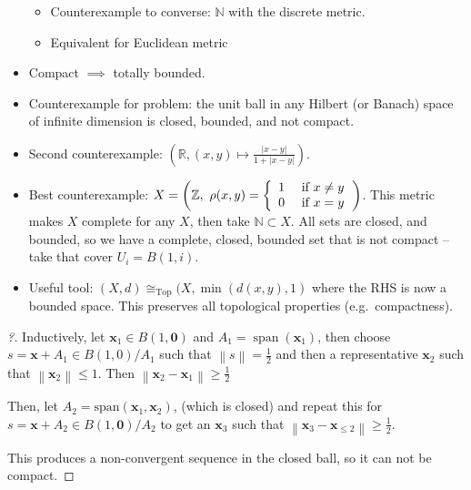 \begin{solution}
\begin{concept}
\begin{itemize}
  \begin{itemize}
  \tightlist
  \item
    Counterexample to converse: \({\mathbb{N}}\) with the discrete
    metric.
  \item
    Equivalent for Euclidean metric
  \end{itemize}
\item
  Compact \(\implies\) totally bounded.
\item
  Counterexample for problem: the unit ball in any Hilbert (or Banach)
  space of infinite dimension is closed, bounded, and not compact.
\item
  Second counterexample:
  \(({\mathbb{R}}, (x,y) \mapsto \frac{{\left\lvert {x-y} \right\rvert}}{1 + {\left\lvert {x-y} \right\rvert}})\).
\item
  Best counterexample:
  \(X = \left({\mathbb{Z}}, ~\rho ( x , y ) = \left\{ \begin{array} { l l } { 1 } & { \text { if } x \neq y } \\ { 0 } & { \text { if } x = y } \end{array} \right.\right)\).
  This metric makes \(X\) complete for any \(X\), then take
  \({\mathbb{N}}\subset X\). All sets are closed, and bounded, so we
  have a complete, closed, bounded set that is not compact -- take that
  cover \(U_i = B(1, i)\).
\item
  Useful tool: \((X, d) \cong_{\text{Top}} (X, \min{(d(x,y), 1)}\) where
  the RHS is now a bounded space. This preserves all topological
  properties (e.g.~compactness).
\end{itemize}

\end{concept}

\begin{proof}[?]

Inductively, let \(\mathbf{x}_1 \in B(1, \mathbf{0})\) and
\(A_1 = {\operatorname{span}}{(\mathbf{x}_1)}\), then choose
\(s = \mathbf{x} + A_1 \in B(1,0)/A_1\) such that
\({\left\lVert {s} \right\rVert} = \frac 1 2\) and then a representative
\(\mathbf{x}_2\) such that
\({\left\lVert {\mathbf{x}_2} \right\rVert} \leq 1\). Then
\({\left\lVert {\mathbf{x}_2 - \mathbf{x}_1} \right\rVert} \geq \frac 1 2\)

Then, let \(A_2 = \mathrm{span}(\mathbf{x}_1, \mathbf{x}_2)\), (which is
closed) and repeat this for
\(s = \mathbf{x} + A_2 \in B(1, \mathbf{0})/ A_2\) to get an
\(\mathbf{x}_3\) such that
\({\left\lVert {\mathbf{x}_3 - \mathbf{x}_{\leq 2}} \right\rVert} \geq \frac 1 2\).

This produces a non-convergent sequence in the closed ball, so it can
not be compact.

\end{proof}

\end{solution}


